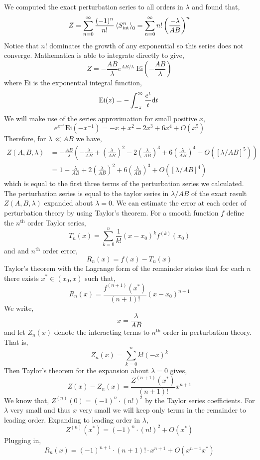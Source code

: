 \documentclass[12pt]{article}
\begin{document}
We computed the exact perturbation series to all orders in $\lambda$ and found that,
\[ Z = \sum_{n = 0}^\infty \frac{(-1)^n}{n!} \left< S_{\mathrm{int}}^n \right>_0 = \sum_{n = 0}^\infty n! \left( \frac{- \lambda}{AB} \right)^n \]
Notice that $n!$ dominates the growth of any exponential so this series does not converge. Mathematica is able to integrate directly to give,
\newcommand{\Ei}{\mathrm{Ei}}
\[ Z = -\frac{AB}{\lambda} e^{AB/\lambda} \; \mathrm{Ei}\left(-\frac{AB}{\lambda}\right) \]
where $\Ei$ is the exponential integral function,
\[ \Ei(z) = - \int_{-z}^\infty \frac{e^t}{t} \d{t} \]
We will make use of the series approximation for small positive $x$,
\[ e^{x^{-1}} \Ei(-x^{-1}) = - x + x^2 - 2 x^3 + 6 x^4 + O(x^5) \]
Therefore, for $\lambda \ll AB$ we have,
\begin{align*}
Z(A, B, \lambda) & = -\frac{AB}{\lambda} \left( - \frac{\lambda}{AB} + \left( \frac{\lambda}{AB} \right)^2 - 2  \left( \frac{\lambda}{AB} \right)^3 + 6  \left( \frac{\lambda}{AB} \right)^4 + O([\lambda / AB]^5) \right) 
\\
& = 1 - \frac{\lambda}{AB} + 2  \left( \frac{\lambda}{AB} \right)^2 + 6  \left( \frac{\lambda}{AB} \right)^3 + O([\lambda / AB]^4) 
\end{align*}
which is equal to the first three terms of the perturbation series we calculated. The perturbation series is equal to the taylor series in $\lambda / AB$ of the exact result $Z(A, B, \lambda)$ expanded about $\lambda = 0$. We can estimate the error at each order of perturbation theory by using Taylor's theorem. For a smooth function $f$ define the $n^{\text{th}}$ order Taylor series,
\[ T_n(x) = \sum_{k = 0}^n \frac{1}{k!} (x - x_0)^k f^{(k)}(x_0) \]
and and $n^{\text{th}}$ order error,
\[ R_n(x) = f(x) - T_n(x) \]
Taylor's theorem with the Lagrange form of the remainder states that for each $n$ there exists $x^* \in (x_0, x)$ such that,
\[ R_n(x) = \frac{f^{(n+1)}(x^*)}{(n+1)!} (x - x_0)^{n+1} \]
We write,
\[ x = \frac{\lambda}{AB} \]
and let $Z_n(x)$ denote the interacting terms to $n^{\text{th}}$ order in perturbation theory. That is,
\[ Z_n(x) = \sum_{k = 0}^n k! (-x)^k \]
Then Taylor's theorem for the expansion about $\lambda = 0$ gives,
\[ Z(x) - Z_n(x) = \frac{Z^{(n+1)}(x^*)}{(n+1)!} x^{n+1} \]
We know that, $Z^{(n)}(0) = (-1)^n \cdot (n!)^2$ by the Taylor series coefficients. For $\lambda$ very small and thus $x$ very small we will keep only terms in the remainder to leading order. Expanding to leading order in $\lambda$, 
\[ Z^{(n)}(x^*) = (-1)^{n} \cdot (n!)^2 + O(x^*) \]
Plugging in,
\[ R_n(x) = (-1)^{n+1} \cdot (n+1)! \cdot x^{n+1} + O(x^{n+1} x^*) \]
\end{document}
